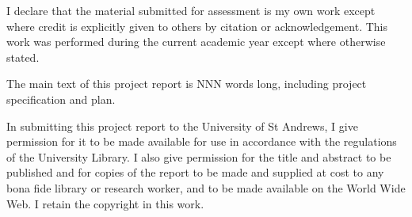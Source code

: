 I declare that the material submitted for assessment is my own work except where credit is explicitly given to others by citation or acknowledgement. This work was performed during the current academic year except where otherwise stated.

The main text of this project report is NNN words long, including project specification and plan.

In submitting this project report to the University of St Andrews, I give permission for it to be made available for use in accordance with the regulations of the University Library. I also give permission for the title and abstract to be published and for copies of the report to be made and supplied at cost to any bona fide library or research worker, and to be made available on the World Wide Web. I retain the copyright in this work.